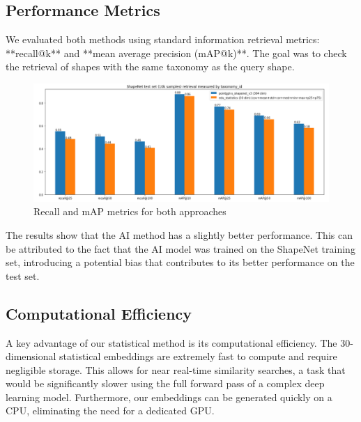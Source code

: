 \documentclass{article}
\begin{document}
\subsection{Performance Metrics}
We evaluated both methods using standard information retrieval metrics: **recall@k** and **mean average precision (mAP@k)**. The goal was to check the retrieval of shapes with the same taxonomy as the query shape.

\begin{figure}[H]
    \centering
    \includegraphics[width=1\linewidth]{pics/image.png}
    \caption{Recall and mAP metrics for both approaches}
\end{figure}

The results show that the AI method has a slightly better performance. This can be attributed to the fact that the AI model was trained on the ShapeNet training set, introducing a potential bias that contributes to its better performance on the test set.

\subsection{Computational Efficiency}
A key advantage of our statistical method is its computational efficiency. The 30-dimensional statistical embeddings are extremely fast to compute and require negligible storage. This allows for near real-time similarity searches, a task that would be significantly slower using the full forward pass of a complex deep learning model. Furthermore, our embeddings can be generated quickly on a CPU, eliminating the need for a dedicated GPU.
\end{document}
